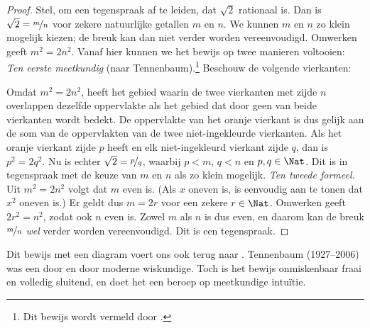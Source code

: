 \documentclass[../../../include/open-logic-section]{subfiles}
\begin{document}
\begin{proof}
Stel, om een tegenspraak af te leiden, dat $\sqrt{2}$ rationaal is.
Dan is $\sqrt{2} = \nicefrac{m}{n}$ voor zekere natuurlijke getallen
$m$ en $n$. We kunnen $m$ en $n$ zo klein mogelijk kiezen; de breuk
kan dan niet verder worden vereenvoudigd. Omwerken geeft $m^{2} =
2n^{2}$. Vanaf hier
kunnen we het bewijs op twee manieren voltooien:
\emph{Ten eerste meetkundig} (naar Tennenbaum).\footnote{Dit bewijs
wordt vermeld door \cite{Conway2006}.} Beschouw de volgende vierkanten:
\begin{center}	
\end{center}
Omdat $m^2 = 2n^2$, heeft het gebied waarin de twee vierkanten met
zijde $n$ overlappen dezelfde oppervlakte als het gebied dat door
geen van beide vierkanten wordt bedekt. De oppervlakte van het oranje
vierkant is dus gelijk aan de som van de oppervlakten van de twee
niet-ingekleurde vierkanten. Als het oranje vierkant zijde $p$ heeft
en elk niet-ingekleurd vierkant zijde $q$, dan is $p^2 = 2q^2$. Nu is
echter $\sqrt{2} = \nicefrac{p}{q}$, waarbij $p < m$, $q < n$ en $p, q
\in \Nat$. Dit is in tegenspraak met de keuze van $m$ en $n$ als zo
klein mogelijk.
\emph{Ten tweede formeel.} Uit $m^{2} = 2n^{2}$ volgt dat $m$ even is.
(Als $x$ oneven is, is eenvoudig aan te tonen dat $x^2$ oneven is.)
Er geldt dus $m = 2r$ voor een zekere $r \in \Nat$. Omwerken geeft
$2r^2 = n^2$,
zodat ook $n$ even is. Zowel $m$ als $n$ is dus even, en daarom kan de
breuk $\nicefrac{m}{n}$ \emph{wel} verder worden vereenvoudigd. Dit
is een tegenspraak.
\end{proof}
Dit bewijs met een diagram voert ons ook terug naar
. Tennenbaum (1927--2006) was een door
en door moderne wiskundige. Toch is het bewijs onmiskenbaar fraai en
volledig sluitend, en doet het een beroep op meetkundige intuïtie.
\end{document}
